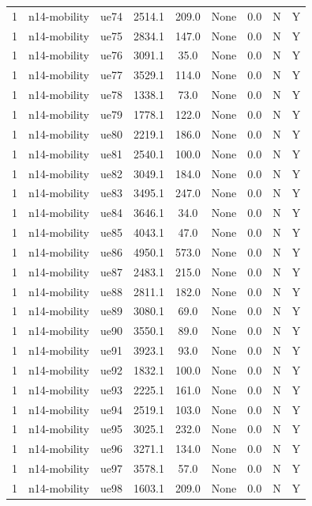 \begin{table}[ht]
\begin{tabular}{|c|c|c|c|c|c|c|c|c|}
1 & n14-mobility & ue74 & 2514.1 & 209.0 & None & 0.0 & N & Y \\
1 & n14-mobility & ue75 & 2834.1 & 147.0 & None & 0.0 & N & Y \\
1 & n14-mobility & ue76 & 3091.1 & 35.0 & None & 0.0 & N & Y \\
1 & n14-mobility & ue77 & 3529.1 & 114.0 & None & 0.0 & N & Y \\
1 & n14-mobility & ue78 & 1338.1 & 73.0 & None & 0.0 & N & Y \\
1 & n14-mobility & ue79 & 1778.1 & 122.0 & None & 0.0 & N & Y \\
1 & n14-mobility & ue80 & 2219.1 & 186.0 & None & 0.0 & N & Y \\
1 & n14-mobility & ue81 & 2540.1 & 100.0 & None & 0.0 & N & Y \\
1 & n14-mobility & ue82 & 3049.1 & 184.0 & None & 0.0 & N & Y \\
1 & n14-mobility & ue83 & 3495.1 & 247.0 & None & 0.0 & N & Y \\
1 & n14-mobility & ue84 & 3646.1 & 34.0 & None & 0.0 & N & Y \\
1 & n14-mobility & ue85 & 4043.1 & 47.0 & None & 0.0 & N & Y \\
1 & n14-mobility & ue86 & 4950.1 & 573.0 & None & 0.0 & N & Y \\
1 & n14-mobility & ue87 & 2483.1 & 215.0 & None & 0.0 & N & Y \\
1 & n14-mobility & ue88 & 2811.1 & 182.0 & None & 0.0 & N & Y \\
1 & n14-mobility & ue89 & 3080.1 & 69.0 & None & 0.0 & N & Y \\
1 & n14-mobility & ue90 & 3550.1 & 89.0 & None & 0.0 & N & Y \\
1 & n14-mobility & ue91 & 3923.1 & 93.0 & None & 0.0 & N & Y \\
1 & n14-mobility & ue92 & 1832.1 & 100.0 & None & 0.0 & N & Y \\
1 & n14-mobility & ue93 & 2225.1 & 161.0 & None & 0.0 & N & Y \\
1 & n14-mobility & ue94 & 2519.1 & 103.0 & None & 0.0 & N & Y \\
1 & n14-mobility & ue95 & 3025.1 & 232.0 & None & 0.0 & N & Y \\
1 & n14-mobility & ue96 & 3271.1 & 134.0 & None & 0.0 & N & Y \\
1 & n14-mobility & ue97 & 3578.1 & 57.0 & None & 0.0 & N & Y \\
1 & n14-mobility & ue98 & 1603.1 & 209.0 & None & 0.0 & N & Y \\

\end{tabular}
\end{table}
